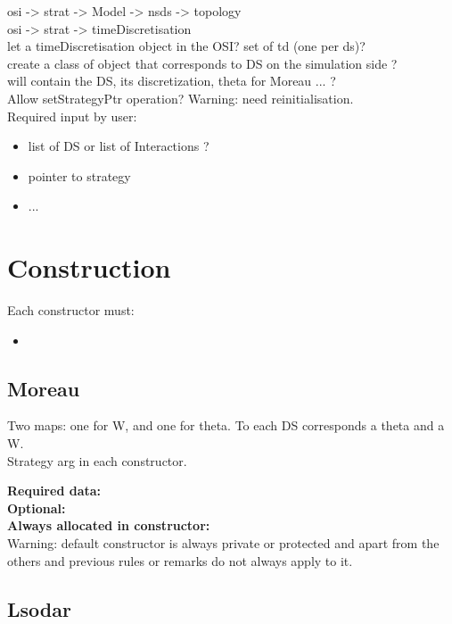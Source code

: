 \documentclass[10pt]{report}
\begin{document}
osi -> strat -> Model -> nsds -> topology \\
osi -> strat -> timeDiscretisation \\

let a timeDiscretisation object in the OSI? set of td (one per ds)? \\
create a class of object that corresponds to DS on the simulation side ? \\
will contain the DS, its discretization, theta for Moreau ... ? \\ 
Allow setStrategyPtr operation? Warning: need reinitialisation. \\


Required input by user: \\
\begin{itemize}
\item list of DS or list of Interactions ? 
\item pointer to strategy
\item ...
\end{itemize}

\section{Construction}

Each constructor must:

\begin{itemize}
\item
\end{itemize}

\subsection{Moreau}

Two maps: one for W, and one for theta. To each DS corresponds a theta and a W. \\
Strategy arg in each constructor.

\textbf{Required data:}\\

\textbf{Optional:}\\

\textbf{Always allocated in constructor:} \\

Warning: default constructor is always private or protected and apart from the others and previous rules or remarks do not always apply to it. 

\subsection{Lsodar}
\end{document}
